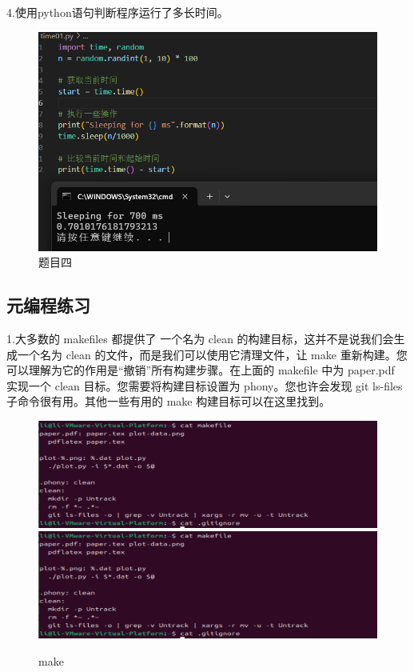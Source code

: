 \documentclass[a4paper, 12pt]{article}
\begin{document}
4.使用python语句判断程序运行了多长时间。

\begin{figure}[H]
  \centering
  \includegraphics[width=\textwidth]{屏幕截图 2024-09-15 141747.png}
  \caption{题目四}
\end{figure}

\subsection{元编程练习}
1.大多数的 makefiles 都提供了 一个名为 clean 的构建目标，这并不是说我们会生成一个名为 clean 的文件，而是我们可以使用它清理文件，让 make 重新构建。您可以理解为它的作用是“撤销”所有构建步骤。在上面的 makefile 中为 paper.pdf 实现一个 clean 目标。您需要将构建目标设置为 phony。您也许会发现 git ls-files 子命令很有用。其他一些有用的 make 构建目标可以在这里找到。
\begin{figure}[H]
  \centering
  \includegraphics[width=\textwidth]{屏幕截图 2024-09-15 215813.png}
  \includegraphics[width=\textwidth]{屏幕截图 2024-09-15 215813.png}
  \caption{make}
\end{figure}
\end{document}
